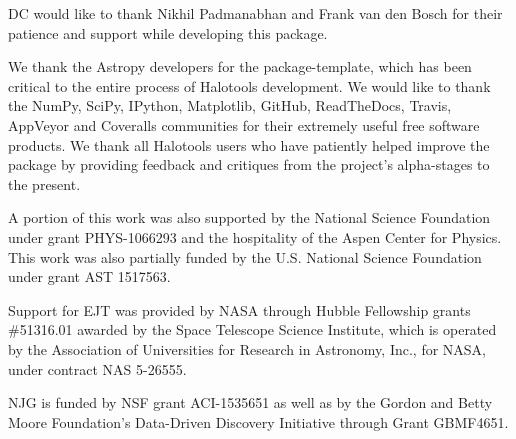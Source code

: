 \documentclass[twocolumn, tighten]{aastex6}
\begin{document}
DC would like to thank Nikhil Padmanabhan and Frank van den Bosch for their patience and support while developing this package.

We thank the Astropy developers for the package-template, which has been critical to the entire process of Halotools development. 
We would like to thank the NumPy, SciPy, IPython, Matplotlib, GitHub, ReadTheDocs, Travis, AppVeyor and Coveralls communities for their extremely useful free software products. We thank all Halotools users who have patiently helped improve the package by providing feedback and critiques from the project's alpha-stages to the present. 

A portion of this work was also supported by the National Science Foundation under grant PHYS-1066293 and the hospitality of the Aspen Center for Physics. This work was also partially funded by the U.S. National Science Foundation under grant AST 1517563. 

Support for EJT was provided by NASA through Hubble Fellowship grants \#51316.01 awarded by the Space Telescope Science Institute, which is operated by the Association of Universities for Research in Astronomy, Inc., for NASA, under contract NAS 5-26555.  

NJG is funded by NSF grant ACI-1535651 as well as by the Gordon and Betty Moore Foundation's Data-Driven Discovery Initiative through Grant GBMF4651.












\end{document}
